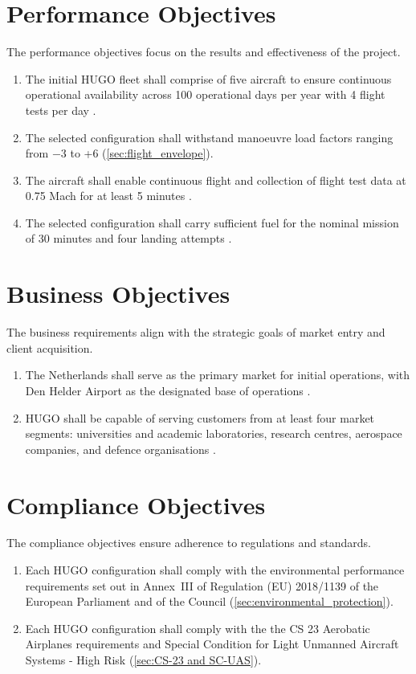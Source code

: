 \section{Performance Objectives}
The performance objectives focus on the results and effectiveness of the project.

\begin{enumerate}
    \item The initial HUGO fleet shall comprise of five aircraft to ensure continuous operational availability across 100 operational days per year with 4 flight tests per day .
    \item The selected configuration shall withstand manoeuvre load factors ranging from −3 to +6 (\autoref{sec:flight_envelope}).
    \item The aircraft shall enable continuous flight and collection of flight test data at 0.75 Mach for at least 5 minutes .
    \item The selected configuration shall carry sufficient fuel for the nominal mission of 30 minutes and four landing attempts .
\end{enumerate}

\section{Business Objectives}
The business requirements align with the strategic goals of market entry and client acquisition.
\begin{enumerate}
    \item The Netherlands shall serve as the primary market for initial operations, with Den Helder Airport as the designated base of operations .
    \item HUGO shall be capable of serving customers from at least four market segments: universities and academic laboratories, research centres, aerospace companies, and defence organisations .
\end{enumerate}

\section{Compliance Objectives}
The compliance objectives ensure adherence to regulations and standards.

\begin{enumerate}
    \item Each HUGO configuration shall comply with the environmental performance requirements set out in Annex~III of Regulation (EU) 2018/1139 of the European Parliament and of the Council (\autoref{sec:environmental_protection}).
    \item Each HUGO configuration shall comply with the the CS 23 Aerobatic Airplanes requirements and Special Condition for Light Unmanned Aircraft Systems - High Risk (\autoref{sec:CS-23 and SC-UAS}).
\end{enumerate} 